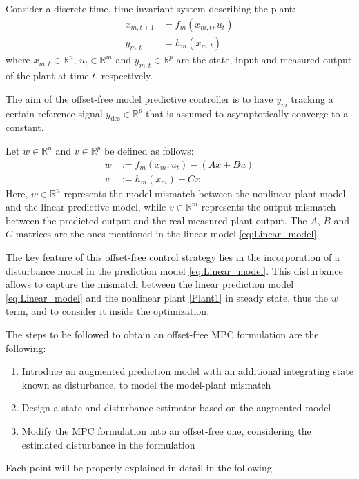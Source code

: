 \documentclass[a4paper,12pt,oneside]{book}
\begin{document}
\bigskip
Consider a discrete-time, time-invariant system describing the plant:
\begin{equation}
\begin{aligned}
    x_{m,t+1} &= f_m (x_{m,t}, u_t) \\
    y_{m,t} &= h_m (x_{m,t}) 
\end{aligned}
\label{Plant1}
\end{equation}
where $x_{m,t} \in \mathbb{R}^n$, $u_t \in \mathbb{R}^m$ and $y_{m,t} \in \mathbb{R}^p$ are the state, input and measured output of the plant at time $t$, respectively.

The aim of the offset-free model predictive controller is to have $y_m$ tracking a certain reference signal $y_{\text{des}} \in \mathbb{R}^p$ that is assumed to asymptotically converge to a constant.

\bigskip
Let $w \in \mathbb{R}^n$ and $v \in \mathbb{R}^p$ be defined as follows:
\begin{equation}
\begin{aligned}
    w & := f_m (x_m, u_t) - (A x + Bu) \\
    v & := h_m (x_m) - C x
\end{aligned}
\label{Plant_model_mismatch}
\end{equation}
Here, $w \in \mathbb{R}^n$ represents the model mismatch between the nonlinear plant model and the linear predictive model, while $v \in \mathbb{R}^m$ represents the output mismatch between the predicted output and the real measured plant output.
The $A$, $B$ and $C$ matrices are the ones mentioned in the linear model \eqref{eq:Linear_model}.

\bigskip
The key feature of this offset-free control strategy lies in the incorporation of a disturbance model in the prediction model \eqref{eq:Linear_model}.
This disturbance allows to capture the mismatch between the linear prediction model \eqref{eq:Linear_model} and the nonlinear plant \eqref{Plant1} in steady state, thus the $w$ term, and to consider it inside the optimization.

The steps to be followed to obtain an offset-free MPC formulation are the following:
\begin{enumerate}
	\item Introduce an augmented prediction model with an additional integrating state known as disturbance, to model the model-plant mismatch
	\item Design a state and disturbance estimator based on the augmented model
	\item Modify the MPC formulation into an offset-free one, considering the estimated disturbance in the formulation
\end{enumerate}
Each point will be properly explained in detail in the following.
\end{document}

